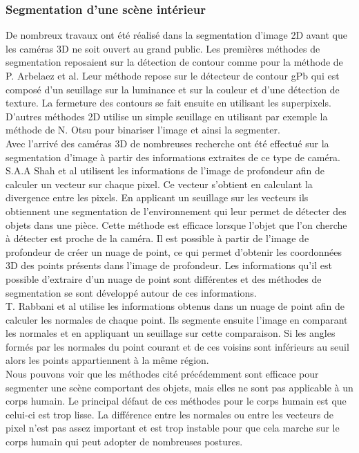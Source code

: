 \subsubsection{Segmentation d'une scène intérieur}
De nombreux travaux ont été réalisé dans la segmentation d'image 2D avant que les caméras 3D ne soit
ouvert au grand public. Les premières méthodes de segmentation reposaient sur la détection de contour
comme pour la méthode de P. Arbelaez et al\cite{2DSegmentation1}. Leur méthode repose sur le détecteur
de contour gPb qui est composé d'un seuillage sur la luminance et sur la couleur et d'une détection
de texture. La fermeture des contours se fait ensuite en utilisant les superpixels. D'autres méthodes
2D utilise un simple seuillage en utilisant par exemple la méthode de N. Otsu\cite{Otsu} pour binariser
l'image et ainsi la segmenter.\\

Avec l'arrivé des caméras 3D de nombreuses recherche ont été effectué sur la segmentation d'image à partir
des informations extraites de ce type de caméra. S.A.A Shah et al\cite{3DSegmentation1} utilisent les informations
de l'image de profondeur afin de calculer un vecteur sur chaque pixel. Ce vecteur s'obtient en calculant la divergence 
entre les pixels. En applicant un seuillage sur les vecteurs ils obtiennent une segmentation de l'environnement 
qui leur permet de détecter des objets dans une pièce. Cette méthode est efficace lorsque l'objet que l'on 
cherche à détecter est proche de la caméra. Il est possible à partir de l'image de profondeur de créer un 
nuage de point, ce qui permet d'obtenir les coordonnées 3D des points présents dans l'image de profondeur. Les informations 
qu'il est possible d'extraire d'un nuage de point sont différentes et des méthodes de segmentation se sont développé autour de ces informations.\\

T. Rabbani et al\cite{pointCloudSegmentation} utilise les informations obtenus dans un nuage de point afin 
de calculer les normales de chaque point. Ils segmente ensuite l'image en comparant les normales et en appliquant
un seuillage sur cette comparaison. Si les angles formés par les normales du point courant et de ces voisins sont inférieurs au seuil alors
les points appartiennent à la même région.\\
 
Nous pouvons voir que les méthodes cité précédemment sont efficace pour segmenter une scène comportant des objets,
mais elles ne sont pas applicable à un corps humain. Le principal défaut de ces méthodes pour le corps humain est 
que celui-ci est trop lisse. La différence entre les normales ou entre les vecteurs de pixel n'est pas assez important
et est trop instable pour que cela marche sur le corps humain qui peut adopter de nombreuses postures.

